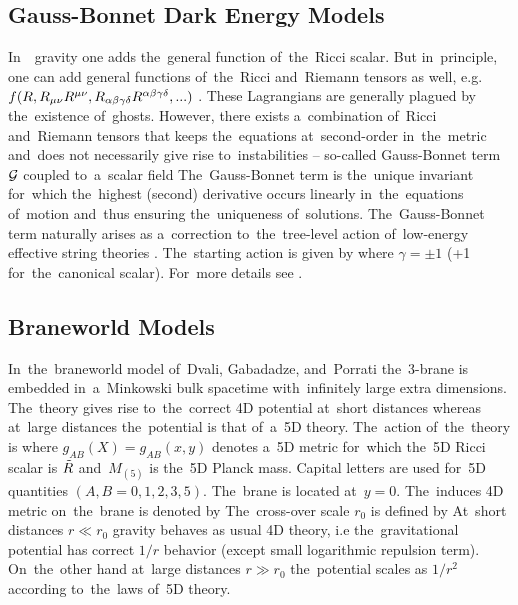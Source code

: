 \subsection{Gauss-Bonnet Dark Energy Models}
In~\fR\ gravity one adds the~general function of~the~Ricci scalar. But in~principle, one can add general functions of~the~Ricci and~Riemann tensors as well, e.g. $f(R,R_{\mu\nu} R^{\mu\nu},R_{\alpha\beta\gamma\delta}R^{\alpha\beta\gamma\delta},...)$ \parencite{2005PhRvD..71f3513C}. These Lagrangians are generally plagued by the~existence of~ghosts.  However, there exists a~combination of~Ricci and~Riemann tensors that keeps the~equations at~second-order in~the~metric and~does not necessarily give rise to~instabilities -- so-called Gauss-Bonnet term $\mathcal{G}$ coupled to~a~scalar field
The~Gauss-Bonnet term is the~unique invariant for~which the~highest (second) derivative occurs linearly in~the~equations of~motion and~thus ensuring the~uniqueness of~solutions. The~Gauss-Bonnet term naturally arises as a~correction to~the~tree-level action of~low-energy effective string theories \parencite{2000PhR...337..343L}. The~starting action is given by
where $\gamma=\pm1$ (+1 for~the~canonical scalar). For~more details see \textcite{2005PhRvD..71l3509N,2006JCAP...06..004N,2013PhRvD..87h4037C}.
\subsection{Braneworld Models}
In~the~braneworld model of~Dvali, Gabadadze, and~Porrati \parencite[DGP model][]{2000PhLB..485..208D} the~3-brane is embedded in~a~Minkowski bulk spacetime with~infinitely large extra dimensions. The~theory gives rise to~the~correct 4D potential at~short distances whereas at~large distances the~potential is that of~a~5D theory. The~action of~the~theory is
where $g_{AB}(X)=g_{AB}(x,y)$ denotes a~5D metric for~which the~5D Ricci scalar is ${\tilde{R}}$ and~$M_{(5)}$ is the~5D Planck mass. Capital letters are used for~5D quantities $(A,B=0,1,2,3,5)$. The~brane is located at~$y=0$. The~induces 4D metric on~the~brane is denoted by
The~cross-over scale $r_0$ is defined by
At~short distances $r\ll r_0$ gravity behaves as usual 4D theory, i.e the~gravitational potential has correct $1/r$ behavior (except small logarithmic repulsion term). On~the~other hand at~large distances $r\gg r_0$ the~potential scales as $1/r^2$ according to~the~laws of~5D theory.

